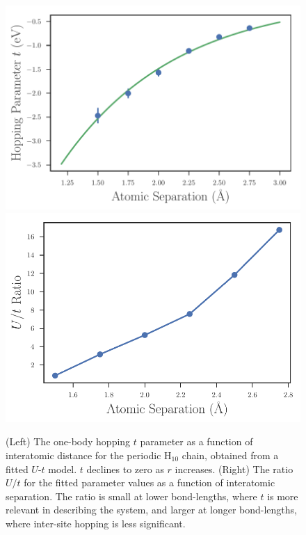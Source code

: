 \begin{figure}
\centering
\includegraphics[scale=0.5]{./Figures/fitted_t_values_no_annotate_h10_chain.pdf}
\includegraphics[scale=0.5]{./Figures/Ust_ratio_vs_separation_h_chain.pdf}
\caption{(Left) The one-body hopping $t$ parameter as a function of interatomic distance for the periodic H$_{10}$ chain, obtained from a fitted $U$-$t$ model. $t$ declines to zero as $r$ increases. (Right) The ratio $U/t$ for the fitted parameter values as a function of interatomic separation. The ratio is small at lower bond-lengths, where $t$ is more relevant in describing the system, and larger at longer bond-lengths, where inter-site hopping is less significant. }\label{fig:Parameters-vs-Bond-t}
\end{figure}
